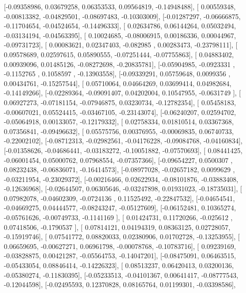 \documentclass{article}
\begin{document}
       [-0.09358986,  0.03679258,  0.06353533,  0.09564819, -0.14948488],
       [ 0.00559348, -0.00813382, -0.04829501, -0.08697483, -0.10303009],
       [-0.01287297, -0.06666875, -0.11704654, -0.04524654, -0.14496333],
       [ 0.02634786,  0.06144264,  0.05032494, -0.03134194, -0.04563395],
       [ 0.10024685, -0.08006915,  0.00186336,  0.00044967, -0.09731723],
       [ 0.00083621,  0.02347403, -0.082985  ,  0.00283473, -0.23798111],
       [ 0.09578689,  0.02597615,  0.05890555, -0.07251444, -0.07755863],
       [ 0.04883402,  0.00939096,  0.01485126, -0.08272698, -0.20835781],
       [-0.05904985, -0.0923331 , -0.1152765 ,  0.1058597 , -0.13903558],
       [-0.09339291,  0.05759648,  0.0099356 ,  0.00434761, -0.15257544],
       [ 0.05710064,  0.04664269,  0.03699414,  0.04982684, -0.14149266],
       [-0.02289364, -0.09091407,  0.04202004,  0.10547955, -0.0631749 ],
       [ 0.06927273, -0.07181154, -0.07946875,  0.03230734, -0.12782354],
       [ 0.05458183, -0.00607021,  0.05524415, -0.03467105, -0.23143074],
       [-0.06240207,  0.02594702, -0.05064918,  0.00133057, -0.12179332],
       [ 0.02758334,  0.01810514,  0.03367368,  0.07356841, -0.09496632],
       [ 0.05575756,  0.00376955, -0.00069835,  0.06740733, -0.22002102],
       [-0.08712313, -0.02982561, -0.04176228, -0.09084768, -0.04160834],
       [-0.01358626, -0.04686441, -0.03183272, -0.10051882, -0.07570693],
       [ 0.08441425, -0.06001454,  0.05000762,  0.07968554, -0.07357366],
       [-0.09654227,  0.0500307 ,  0.08232438, -0.06836071, -0.16414573],
       [-0.08977028, -0.02657182,  0.0099629 , -0.03211954, -0.23029372],
       [-0.00216466,  0.02622934, -0.08101876, -0.03883408, -0.12636968],
       [-0.02644507,  0.06305646, -0.03247898,  0.01931023, -0.18735031],
       [ 0.07982078, -0.04602309, -0.0724136 ,  0.11525492, -0.22847532],
       [-0.04654541, -0.04669275,  0.04444577, -0.08243247, -0.05127609],
       [-0.06152481,  0.10365274, -0.05761626, -0.00749733, -0.1141169 ],
       [ 0.01424731,  0.11720266, -0.025612  ,  0.07418506, -0.1790537 ],
       [ 0.07814121,  0.04194319,  0.08363125,  0.02728057, -0.15919746],
       [ 0.07541772,  0.08820033,  0.02380906,  0.01702728, -0.13253955],
       [ 0.06659695, -0.00627271,  0.06961798, -0.00078768, -0.10783716],
       [ 0.09239169, -0.03828875,  0.00421287, -0.05564753, -0.14047201],
       [-0.08475091,  0.06463515, -0.05433054,  0.08846414, -0.14226323],
       [ 0.08513237,  0.06420413,  0.03200136, -0.05380274, -0.11830395],
       [-0.05233513, -0.04101367,  0.00641417, -0.08777543, -0.12044598],
       [-0.02495593,  0.12370828,  0.08165764,  0.01199301, -0.03398586],
\end{document}
